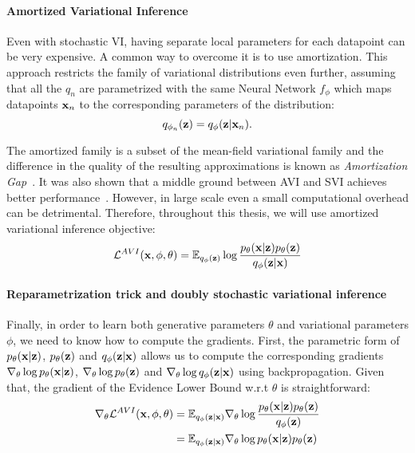 \paragraph{Amortized Variational Inference}
Even with stochastic VI, having separate local parameters for each datapoint can be very expensive. 
A common way to overcome it is to use amortization. This approach restricts the family of variational distributions even further, assuming that all the $q_n$ are parametrized with the same Neural Network $f_{\phi}$ which maps datapoints ${\mathbf{x}}_n$ to the corresponding parameters of the distribution: 
\begin{equation}
    q_{\phi_n}({\mathbf{z}}) = q_{\phi}({\mathbf{z}} |{\mathbf{x}}_n).
\end{equation}

The amortized family is a subset of the mean-field variational family and the difference in the quality of the resulting approximations is known as \textit{Amortization Gap}~\citep{cremer2018inference}. It was also shown that a middle ground between AVI and SVI achieves better performance~\citep{kim2018semi}. However, in large scale even a small computational overhead can be detrimental. Therefore, throughout this thesis, we will use amortized variational inference objective:
\begin{equation}\label{eq:intro_avi}
     \mathcal{L}^{AVI}(\rvx, \phi, \theta) =  \E_{q_{\phi}(\rvz)}\log  \frac{p_{\theta}(\rvx|\rvz)p_{\theta}(\rvz)}{q_{\phi}(\rvz|\rvx)}
\end{equation}

\paragraph{Reparametrization trick and doubly stochastic variational inference}
Finally, in order to learn both generative parameters $\theta$ and variational parameters $\phi$, we need to know how to compute the gradients. First, the parametric form of $p_{\theta}({\mathbf{x}}|{\mathbf{z}})$, $p_{\theta}({\mathbf{z}})$ and $q_{\phi}({\mathbf{z}}|{\mathbf{x}})$ allows us to compute the corresponding gradients $\nabla_{\theta}\log p_{\theta}({\mathbf{x}}|{\mathbf{z}})$, $\nabla_{\theta}\log p_{\theta}({\mathbf{z}})$ and $\nabla_{\theta}\log q_{\phi}({\mathbf{z}}|{\mathbf{x}})$ using backpropagation. Given that, the gradient of the Evidence Lower Bound w.r.t $\theta$ is straightforward:
\begin{equation}
    \begin{aligned}
      \nabla_{\theta}\mathcal{L}^{AVI}({\mathbf{x}}, \phi, \theta) 
      &= \mathbb{E}_{q_{\phi}({\mathbf{z}}|{\mathbf{x}})} \nabla_{\theta} \log  \frac{p_{\theta}({\mathbf{x}}|{\mathbf{z}})p_{\theta}({\mathbf{z}})}{q_{\phi}({\mathbf{z}})} \\
      &= \mathbb{E}_{q_{\phi}({\mathbf{z}}|{\mathbf{x}})} \nabla_{\theta} \log p_{\theta}({\mathbf{x}}|{\mathbf{z}})p_{\theta}({\mathbf{z}})
    \end{aligned}
\end{equation}

